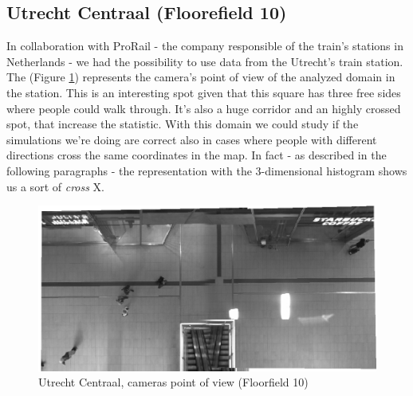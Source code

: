 \documentclass[class=article, crop=false]{standalone}
\begin{document}
\subsection{Utrecht Centraal (Floorefield 10)}
In collaboration with ProRail - the company responsible of the train's stations in Netherlands - we had the possibility to use data from the Utrecht's train station.
The (Figure \ref{trainf10}) represents the camera's point of view of the analyzed domain in the station.
This is an interesting spot given that this square has three free sides where people could walk through.
It's also a huge corridor and an highly crossed spot, that increase the statistic.
With this domain we could study if the simulations we're doing are correct also in cases where people with different directions cross the same coordinates in the map.
In fact - as described in the following paragraphs - the representation with the 3-dimensional histogram shows us a sort of \emph{cross} X.
\begin{figure}[h]
\centering
\includegraphics[width=0.4\textheight]{imgs/bg10.png}
\caption{Utrecht Centraal, cameras point of view (Floorfield 10)}
\label{trainf10}
\end{figure}
\end{document}
